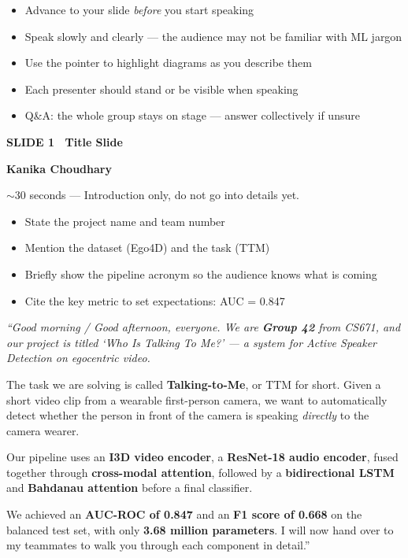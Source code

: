 \documentclass[11pt, a4paper]{article}
\newcommand{\slideheading}[3]{%
  \vspace{0.6cm}
  \begin{tcolorbox}[slidebox]
    \textbf{\color{NavyBlue}SLIDE #1 \textemdash\ #2}\\[2pt]
    \begin{tcolorbox}[presenterbox, title=Presenter(s)]
      \color{AccBlue}\bfseries #3
    \end{tcolorbox}
  \end{tcolorbox}
}
\newcommand{\timing}[1]{%
  \begin{tcolorbox}[timebox, title=Suggested Time]
    \color{AccOrange} #1
  \end{tcolorbox}
}
\newcommand{\keypoints}[1]{%
  \begin{tcolorbox}[keybox, title=Key Points to Cover]
    #1
  \end{tcolorbox}
}
\newcommand{\script}[1]{%
  \begin{mdframed}[
    backgroundcolor=white,
    linecolor=MidText!40,
    linewidth=0.5pt,
    leftmargin=0pt,
    rightmargin=0pt,
    innerleftmargin=10pt,
    innerrightmargin=8pt,
    innertopmargin=8pt,
    innerbottommargin=8pt,
    roundcorner=3pt
  ]
  \itshape\color{MidText}
  #1
  \end{mdframed}
}
\begin{document}
\vspace{0.4cm}
\begin{tcolorbox}[
  colback=AccOrange!10, colframe=AccOrange,
  leftrule=5pt, arc=3pt, title={\bfseries Before You Begin --- Quick Checklist}
]
\begin{itemize}[leftmargin=*, itemsep=2pt]
  \item[\checkmark] Advance to your slide \textit{before} you start speaking
  \item[\checkmark] Speak slowly and clearly --- the audience may not be familiar with ML jargon
  \item[\checkmark] Use the pointer to highlight diagrams as you describe them
  \item[\checkmark] Each presenter should stand or be visible when speaking
  \item[\checkmark] Q\&A: the whole group stays on stage --- answer collectively if unsure
\end{itemize}
\end{tcolorbox}

\newpage


\slideheading{1}{Title Slide}{Kanika Choudhary}

\timing{$\sim$30 seconds --- Introduction only, do not go into details yet.}

\keypoints{%
\begin{itemize}[leftmargin=*, itemsep=2pt]
  \item State the project name and team number
  \item Mention the dataset (Ego4D) and the task (TTM)
  \item Briefly show the pipeline acronym so the audience knows what is coming
  \item Cite the key metric to set expectations: AUC = 0.847
\end{itemize}
}

\script{%
``Good morning / Good afternoon, everyone. We are \textbf{Group 42} from CS671, and our project is titled \textit{`Who Is Talking To Me?'} --- a system for Active Speaker Detection on egocentric video.

The task we are solving is called \textbf{Talking-to-Me}, or TTM for short. Given a short video clip from a wearable first-person camera, we want to automatically detect whether the person in front of the camera is speaking \textit{directly} to the camera wearer.

Our pipeline uses an \textbf{I3D video encoder}, a \textbf{ResNet-18 audio encoder}, fused together through \textbf{cross-modal attention}, followed by a \textbf{bidirectional LSTM} and \textbf{Bahdanau attention} before a final classifier.

We achieved an \textbf{AUC-ROC of 0.847} and an \textbf{F1 score of 0.668} on the balanced test set, with only \textbf{3.68 million parameters}. I will now hand over to my teammates to walk you through each component in detail.''
}
\end{document}
